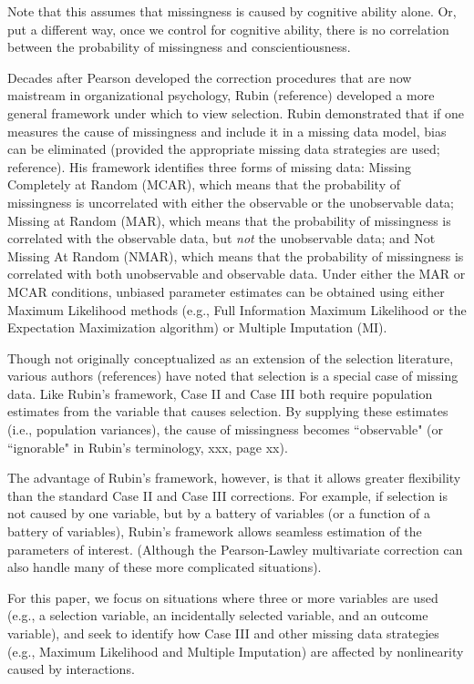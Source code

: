 \documentclass[doc, babel,english]{apa}%
\begin{document}
Note that this assumes that missingness is caused by cognitive ability alone. Or, put a different way, once we control for cognitive ability, there is no correlation between the probability of missingness and conscientiousness. 

Decades after Pearson developed the correction procedures that are now maistream in organizational psychology, Rubin (reference) developed a more general framework under which to view selection. Rubin demonstrated that if one measures the cause of missingness and include it in a missing data model, bias can be eliminated (provided the appropriate missing data strategies are used; reference). His framework identifies three forms of missing data: Missing Completely at Random (MCAR), which means that the probability of missingness is uncorrelated with either the observable or the unobservable data; Missing at Random (MAR), which means that the probability of missingness is correlated with the observable data, but \emph{not} the unobservable data; and Not Missing At Random (NMAR), which means that the probability of missingness is correlated with both unobservable and observable data. Under either the MAR or MCAR conditions, unbiased parameter estimates can be obtained using either Maximum Likelihood methods (e.g., Full Information Maximum Likelihood or the Expectation Maximization algorithm) or Multiple Imputation (MI). 

Though not originally conceptualized as an extension of the selection literature, various authors (references) have noted that selection is a special case of missing data. Like Rubin's framework, Case II and Case III both require population estimates from the variable that causes selection. By supplying these estimates (i.e., population variances), the cause of missingness becomes ``observable" (or ``ignorable" in Rubin's terminology, xxx, page xx).

The advantage of Rubin's framework, however, is that it allows greater flexibility than the standard Case II and Case III corrections. For example, if selection is not caused by one variable, but by a battery of variables (or a function of a battery of variables), Rubin's framework allows seamless estimation of the parameters of interest. (Although the Pearson-Lawley multivariate correction can also handle many of these more complicated situations). 

For this paper, we focus on situations where three or more variables are used (e.g., a selection variable, an incidentally selected variable, and an outcome variable), and seek to identify how Case III and other missing data strategies (e.g., Maximum Likelihood and Multiple Imputation) are affected by nonlinearity caused by interactions. 
\end{document}
